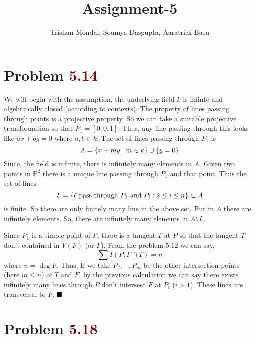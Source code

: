 \documentclass[12pt]{article}
\title{\textbf{Assignment-5}}
\author{Trishan Mondal, Soumya Dasgupta, Aaratrick Basu}
\date{}
\begin{document}
\maketitle

\section*{Problem \textcolor{maroon}{5.14}}
We will begin with the assumption, the underlying field $k$ is infinte and algebraically closed (according to contexts). The property of lines passing through points is a projective property. So we can take a suitable projective transformation so that $P_1 = [0:0:1]$. Thus, any line passing through this looks like $ax +by = 0$ where $a,b \in k$. The set of lines passing through $P_1$ is $$A = \qty{x+my : m \in k} \cup \qty{y=0}$$ Since, the field is infinite, there is infinitely many elements in $A$. Given two points in $\mathbb{P}^2$ there is a unique line passing through $P_1$ and that point. Thus the set of lines $$L=\qty{\ell \text{ pass through } P_1 \text{ and }P_{i} : 2 \leq i \leq n} \subset A$$ is finite. So there are only finitely many line in the above set. But in $A$ there are infinitely elements. So, there are infinitely many elements in $A \setminus L$.

\vspace*{0.2cm}

\noindent Since $P_1$ is a simple point of $F$, there is a tangent $T$ at $P$ so that the tangent $T$ don't contained in $V(F)$ (or $F$). From the problem \textcolor{maroon}{5.12} we can say, $$\sum I(P;F\cap T)=n$$ where $n = \deg F$. Thus, If we take $P_2,\cdots,P_m$ be the other intersection points (here $m \leq n$) of $T$ and $F$, by the previous calculation we can say there exists infinitely many lines through $P$ don't intersect $F$ at $P_i$ ($i >1$). These lines are transversal to $F$. $\hfill \blacksquare$

\section*{Problem \textcolor{maroon}{5.18}}
\end{document}
